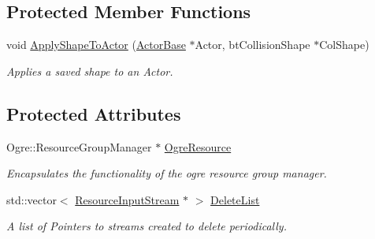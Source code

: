 \subsection*{Protected Member Functions}
\begin{DoxyCompactItemize}
\item 
\hypertarget{classphys_1_1ResourceManager_a1823d2d08fc3b6052ed893896eef6291}{
void \hyperlink{classphys_1_1ResourceManager_a1823d2d08fc3b6052ed893896eef6291}{ApplyShapeToActor} (\hyperlink{classphys_1_1ActorBase}{ActorBase} $\ast$Actor, btCollisionShape $\ast$ColShape)}
\label{d1/d35/classphys_1_1ResourceManager_a1823d2d08fc3b6052ed893896eef6291}

\begin{DoxyCompactList}\small\item\em Applies a saved shape to an Actor. \item\end{DoxyCompactList}\end{DoxyCompactItemize}
\subsection*{Protected Attributes}
\begin{DoxyCompactItemize}
\item 
\hypertarget{classphys_1_1ResourceManager_af19bf0549a0896cf84696a39f4ca817d}{
Ogre::ResourceGroupManager $\ast$ \hyperlink{classphys_1_1ResourceManager_af19bf0549a0896cf84696a39f4ca817d}{OgreResource}}
\label{d1/d35/classphys_1_1ResourceManager_af19bf0549a0896cf84696a39f4ca817d}

\begin{DoxyCompactList}\small\item\em Encapsulates the functionality of the ogre resource group manager. \item\end{DoxyCompactList}\item 
\hypertarget{classphys_1_1ResourceManager_a03a283e02f3639f5c1f2de915ed798ae}{
std::vector$<$ \hyperlink{classphys_1_1ResourceInputStream}{ResourceInputStream} $\ast$ $>$ \hyperlink{classphys_1_1ResourceManager_a03a283e02f3639f5c1f2de915ed798ae}{DeleteList}}
\label{d1/d35/classphys_1_1ResourceManager_a03a283e02f3639f5c1f2de915ed798ae}

\begin{DoxyCompactList}\small\item\em A list of Pointers to streams created to delete periodically. \item\end{DoxyCompactList}\end{DoxyCompactItemize}


